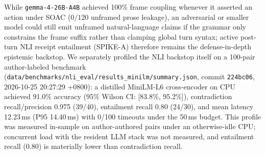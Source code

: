 \documentclass[11pt,a4paper]{article}
\begin{document}
While \texttt{gemma-4-26B-A4B} achieved 100\% frame coupling whenever it asserted an action under SOAC ($0/120$ unframed prose leakage), an adversarial or smaller model could still emit unframed natural-language claims if the grammar only constrains the frame suffix rather than clamping global turn syntax; active post-turn NLI receipt entailment (SPIKE-A) therefore remains the defense-in-depth epistemic backstop. We separately profiled the NLI backstop itself on a 100-pair author-labeled benchmark (\texttt{data/benchmarks/nli\_eval/results\_minilm/summary.json}, commit \texttt{224bc06}, 2026-10-25 20:27:29 +0800): a distilled MiniLM-L6 cross-encoder on CPU achieved 91.0\% accuracy (95\% Wilson CI: [83.8\%, 95.2\%]), contradiction recall/precision 0.975 (39/40), entailment recall 0.80 (24/30), and mean latency 12.23\,ms (P95 14.40\,ms) with 0/100 timeouts under the 50\,ms budget. This profile was measured in-sample on author-authored pairs under an otherwise-idle CPU; concurrent load with the resident LLM stack was not measured, and entailment recall (0.80) is materially lower than contradiction recall.
\end{document}
